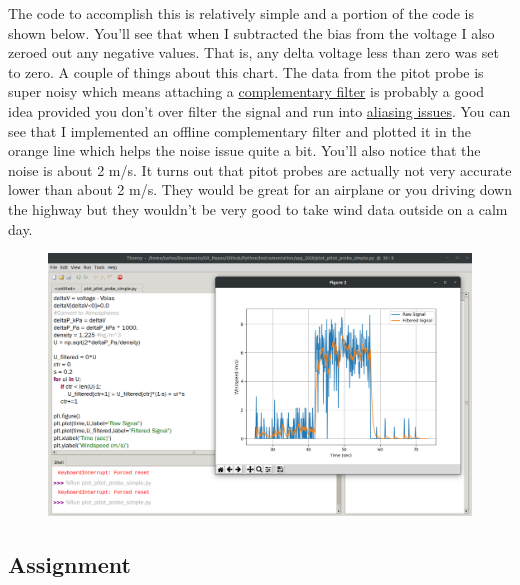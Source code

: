 The code to accomplish this is relatively simple and a portion of the code is shown below. You’ll see that when I subtracted the bias from the voltage I also zeroed out any negative values. That is, any delta voltage less than zero was set to zero. A couple of things about this chart. The data from the pitot probe is super noisy which means attaching a \href{https://youtu.be/zTGa4sk6UZE}{complementary filter} is probably a good idea provided you don’t over filter the signal and run into \href{https://youtu.be/8F_8st_8MmA}{aliasing issues}. You can see that I implemented an offline complementary filter and plotted it in the orange line which helps the noise issue quite a bit. You’ll also notice that the noise is about 2 m/s. It turns out that pitot probes are actually not very accurate lower than about 2 m/s. They would be great for an airplane or you driving down the highway but they wouldn’t be very good to take wind data outside on a calm day.
\begin{figure}[H]
  \begin{center}
    \includegraphics[width=\textwidth]{Figures/pitot_probe_final.png}
  \end{center}
\end{figure}

\subsection{Assignment}



